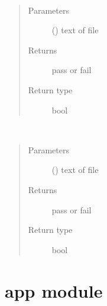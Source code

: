 \documentclass[letterpaper,10pt,english]{sphinxmanual}
\begin{document}
\begin{fulllineitems}
\label{\detokenize{analyze:analyze.createObjects}}~\begin{quote}\begin{description}
\item[{Parameters}] \leavevmode
{} () \textendash{} text of file

\item[{Returns}] \leavevmode
pass or fail

\item[{Return type}] \leavevmode
bool

\end{description}\end{quote}

\end{fulllineitems}


\begin{fulllineitems}
\label{\detokenize{analyze:analyze.scrapeText}}~\begin{quote}\begin{description}
\item[{Parameters}] \leavevmode
{} () \textendash{} text of file

\item[{Returns}] \leavevmode
pass or fail

\item[{Return type}] \leavevmode
bool

\end{description}\end{quote}

\end{fulllineitems}



\chapter{app module}
\label{\detokenize{app::doc}}\label{\detokenize{app:app-module}}\label{\detokenize{app:module-app}}
\end{document}
